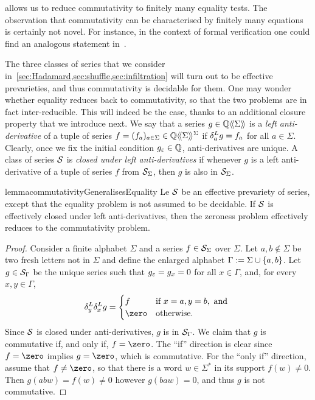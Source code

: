 \begin{remark}
     allows us
    to reduce commutativity to finitely many equality tests.
    The observation that commutativity can be characterised by finitely many equations is certainly not novel.
    For instance, in the context of formal verification
    one could find an analogous statement in~\cite[Prop.~2]{ChenSongWu:CAV:2016}.
\end{remark}

The three classes of series that we consider in~\cref{sec:Hadamard,sec:shuffle,sec:infiltration} will turn out to be effective prevarieties,
and thus commutativity is decidable for them.
%
One may wonder whether equality reduces back to commutativity, so that the two problems are in fact inter-reducible.
This will indeed be the case, thanks to an additional closure property that we introduce next.
%
We say that a series $g \in \mathbb Q\langle\!\langle\Sigma\rangle\!\rangle$
is a \emph{left anti-derivative} of a tuple of series $f = (f_a)_{a \in \Sigma} \in \mathbb Q\langle\!\langle\Sigma\rangle\!\rangle^\Sigma$
if $\delta^L_{a} g = f_a$ for all $a \in \Sigma$.
%
Clearly, once we fix the initial condition $g_\varepsilon \in \mathbb Q$,
anti-derivatives are unique.
%
A class of series $\mathcal S$ is \emph{closed under left anti-derivatives} if
whenever $g$ is a left anti-derivative of a tuple of series $f$ from $\mathcal S_\Sigma$,
then $g$ is also in $\mathcal S_\Sigma$.
%
\begin{restatable}{lemma}{commutativityGeneralisesEquality}
    \label{lem:equality reduces to commutativity}
    Le $\mathcal S$ be an effective prevariety of series, except that the equality problem is not assumed to be decidable.
    If $\mathcal S$ is effectively closed under left anti-derivatives,
    then the zeroness problem effectively reduces to the commutativity problem.
\end{restatable}
\begin{proof}
    Consider a finite alphabet $\Sigma$ and a series $f \in \mathcal S_\Sigma$ over $\Sigma$.
    Let $a, b \not \in \Sigma$ be two fresh letters not in $\Sigma$
    and define the enlarged alphabet $\Gamma := \Sigma \cup \left\{a, b\right\}$.
    Let $g \in \mathcal S_\Gamma$ be the unique series such that $g_\varepsilon = g_x = 0$ for all $x \in \Gamma$,
    and, for every $x, y \in \Gamma$,
    \begin{align*}
        \deriveleft y \deriveleft x g =
        \begin{cases}
            f
                &\text{if } x = a, y = b, \text{ and } \\
            \zero
                &\text{otherwise.}
        \end{cases}
    \end{align*}
    Since $\mathcal S$ is closed under anti-derivatives, $g$ is in $\mathcal S_\Gamma$.
    We claim that $g$ is commutative if, and only if, $f = \zero$.
    The ``if'' direction is clear since $f = \zero$ implies $g = \zero$, which is commutative.
    For the ``only if'' direction, assume that $f \neq \zero$, so that there is a word $w \in \Sigma^*$ in its support $f(w) \neq 0$.
    Then $g(abw) = f(w) \neq 0$ however $g(baw) = 0$,
    and thus $g$ is not commutative.
\end{proof}

